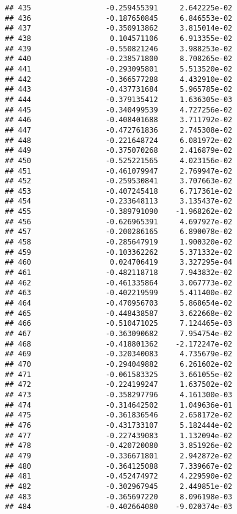\documentclass[
]{article}
\begin{document}
\begin{verbatim}
## 435                 -0.259455391     2.642225e-02
## 436                 -0.187650845     6.846553e-02
## 437                 -0.350913862     3.815014e-02
## 438                  0.104571106     6.913355e-02
## 439                 -0.550821246     3.988253e-02
## 440                 -0.238571800     8.708265e-02
## 441                 -0.293095801     5.513520e-02
## 442                 -0.366577288     4.432910e-02
## 443                 -0.437731684     5.965785e-02
## 444                 -0.379135412     1.636305e-03
## 445                 -0.340499539     4.727256e-02
## 446                 -0.408401688     3.711792e-02
## 447                 -0.472761836     2.745308e-02
## 448                 -0.221648724     6.081972e-02
## 449                 -0.375070268     2.416879e-02
## 450                 -0.525221565     4.023156e-02
## 451                 -0.461079947     2.769947e-02
## 452                 -0.259530841     3.707663e-02
## 453                 -0.407245418     6.717361e-02
## 454                 -0.233648113     3.135437e-02
## 455                 -0.389791090    -1.968262e-02
## 456                 -0.626965391     4.697927e-02
## 457                 -0.200286165     6.890078e-02
## 458                 -0.285647919     1.900320e-02
## 459                 -0.103362262     5.371332e-02
## 460                  0.024706419     3.327295e-04
## 461                 -0.482118718     7.943832e-02
## 462                 -0.461335864     3.067773e-02
## 463                 -0.402219599     5.411400e-02
## 464                 -0.470956703     5.868654e-02
## 465                 -0.448438587     3.622668e-02
## 466                 -0.510471025     7.124465e-03
## 467                 -0.363090682     7.954754e-02
## 468                 -0.418801362    -2.172247e-02
## 469                 -0.320340083     4.735679e-02
## 470                 -0.294049882     6.261602e-02
## 471                 -0.061583325     3.661055e-02
## 472                 -0.224199247     1.637502e-02
## 473                 -0.358297796     4.161300e-03
## 474                 -0.314642502     1.049636e-01
## 475                 -0.361836546     2.658172e-02
## 476                 -0.431733107     5.182444e-02
## 477                 -0.227439083     1.132094e-02
## 478                 -0.420720080     3.851926e-02
## 479                 -0.336671801     2.942872e-02
## 480                 -0.364125088     7.339667e-02
## 481                 -0.452474972     4.229590e-02
## 482                 -0.302967945     2.449851e-02
## 483                 -0.365697220     8.096198e-03
## 484                 -0.402664080    -9.020374e-03

\end{verbatim}
\end{document}
